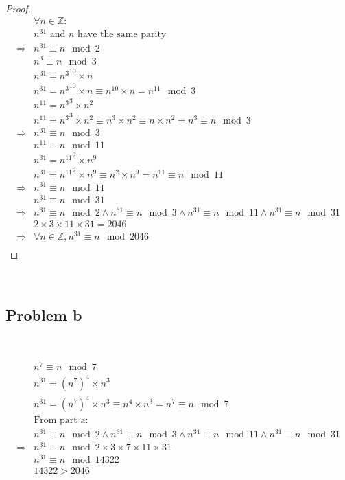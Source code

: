 \documentclass{article}
\begin{document}
~

\begin{proof}
    \begin{align*}
        &\forall n\in\mathbb{Z} :\\
        &n^{31}\text{ and }n\text{ have the same parity}\\
        \Rightarrow&n^{31}\equiv n\mod 2\\
        &n^3\equiv n\mod 3\\
        &n^{31}={n^{3}}^{10}\times n\\
        &n^{31}={n^{3}}^{10}\times n\equiv n^{10}\times n= n^{11}\mod 3\\
        &n^{11}={n^{3}}^{3}\times n^2\\
        &n^{11}={n^{3}}^{3}\times n^2\equiv n^3\times n^2\equiv n\times n^2= n^3\equiv n\mod 3\\
        \Rightarrow&n^{31}\equiv n\mod 3\\
        &n^{11}\equiv n\mod 11\\
        &n^{31}={n^{11}}^2\times n^9\\
        &n^{31}={n^{11}}^2\times n^9\equiv n^2\times n^9= n^11\equiv n\mod 11\\
        \Rightarrow&n^{31}\equiv n\mod 11\\
        &n^{31}\equiv n\mod 31\\
        \Rightarrow&n^{31}\equiv n\mod 2\land n^{31}\equiv n\mod 3\land n^{31}\equiv n\mod 11\land n^{31}\equiv n\mod 31\\
        &2\times 3\times 11\times 31=2046\\
        \Rightarrow&\forall n\in\mathbb{Z} ,n^{31}\equiv n\mod 2046\\
    \end{align*}
\end{proof}

~

\subsection*{Problem b}

~

\begin{align*}
    &n^7\equiv n\mod7\\
    &n^{31}=(n^{7})^4\times n^3\\
    &n^{31}=(n^{7})^4\times n^3\equiv n^4\times n^3=n^7\equiv n\mod 7\\
    &\text{From part a}:\\
    &n^{31}\equiv n\mod 2\land n^{31}\equiv n\mod 3\land n^{31}\equiv n\mod 11\land n^{31}\equiv n\mod 31\\
    \Rightarrow&n^{31}\equiv n\mod 2\times 3\times 7\times 11\times 31\\
    &n^{31}\equiv n\mod 14322\\
    &14322>2046\\
\end{align*}
\end{document}
